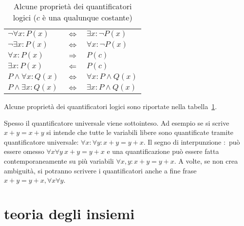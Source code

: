 \begin{table}
\begin{center}
\begin{tabular}{lcl}
$\lnot \forall x \colon P(x)$ & $\iff$ & $\exists x \colon \lnot P(x)$\\
$\lnot \exists x \colon P(x)$ & $\iff$ & $\forall x \colon \lnot P(x)$\\
$\forall x \colon P(x)$ & $\Longrightarrow$ & $P(c)$\\
$\exists x \colon P(x)$ & $\Longleftarrow$ & $P(c)$\\
$P \land \forall x \colon Q(x)$ & $\iff$ & $\forall x\colon P\land Q(x)$\\
$P \land \exists x \colon Q(x)$ & $\iff$ & $\exists x \colon P \land Q(x)$
\end{tabular}
\end{center}
\caption{Alcune proprietà dei quantificatori logici ($c$ è una qualunque costante)}
\label{tab:proprieta_quantificatori}
\end{table}

Alcune proprietà dei quantificatori logici sono riportate
nella tabella~\ref{tab:proprieta_quantificatori}.

Spesso il quantificatore universale viene sottointeso.
Ad esempio se si scrive $x+y=x+y$
si intende che tutte le variabili libere sono quantificate 
tramite quantificatore universale: 
$\forall x\colon \forall y\colon x+y=y+x$.
Il segno di interpunzione $\colon$ può essere omesso
$\forall x \forall y\ x+y=y+x$
e una quantificazione può essere fatta contemporaneamente 
su più variabili $\forall x,y\colon x+y = y+x$.
A volte, se non crea ambiguità, si potranno scrivere 
i quantificatori anche a fine frase $x+y=y+x, \forall x\forall y$.

\section{teoria degli insiemi}

